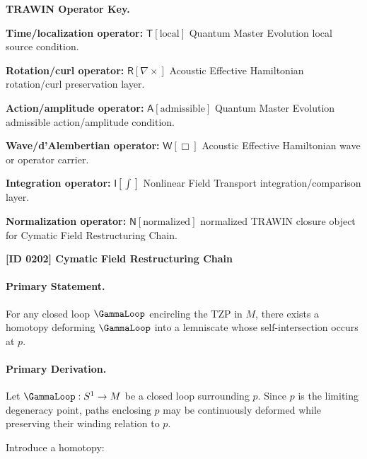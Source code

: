 \par\vspace{0.45\baselineskip}
\noindent\begin{minipage}[t]{\linewidth}
\begingroup
\small
\raggedright
\textbf{TRAWIN Operator Key.}\par
\noindent\textbf{Time/localization operator:} $\mathsf{T}\!\left[\mathrm{local}\right]$ Quantum Master Evolution local source condition.\par
\noindent\textbf{Rotation/curl operator:} $\mathsf{R}\!\left[\nabla\times\right]$ Acoustic Effective Hamiltonian rotation/curl preservation layer.\par
\noindent\textbf{Action/amplitude operator:} $\mathsf{A}\!\left[\mathrm{admissible}\right]$ Quantum Master Evolution admissible action/amplitude condition.\par
\noindent\textbf{Wave/d'Alembertian operator:} $\mathsf{W}\!\left[\Box\right]$ Acoustic Effective Hamiltonian wave or operator carrier.\par
\noindent\textbf{Integration operator:} $\mathsf{I}\!\left[\int\right]$ Nonlinear Field Transport integration/comparison layer.\par
\noindent\textbf{Normalization operator:} $\mathsf{N}\!\left[\mathrm{normalized}\right]$ normalized TRAWIN closure object for Cymatic Field Restructuring Chain.\par
\endgroup
\end{minipage}

\clearpage
\noindent\textbf{[ID 0202] Cymatic Field Restructuring Chain}\par
\vspace{0.35em}
\paragraph{Primary Statement.}
For any closed loop $\GammaLoop$ encircling the TZP in $M$, there exists a homotopy deforming $\GammaLoop$ into a lemniscate whose self-intersection occurs at $p$.

\paragraph{Primary Derivation.}
Let $\GammaLoop:S^1\to M$ be a closed loop surrounding $p$. Since $p$ is the limiting degeneracy point, paths enclosing $p$ may be continuously deformed while preserving their winding relation to $p$.

Introduce a homotopy:

